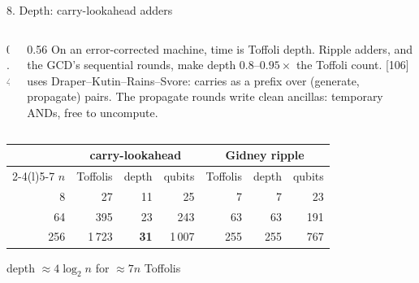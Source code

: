 \documentclass[aspectratio=169,11pt]{beamer}
\begin{document}
\setcounter{framenumber}{196}
\begin{frame}{8. Depth: carry-lookahead adders}
  \begin{columns}[c]
    \begin{column}{0.4\textwidth}
      \centering
    \end{column}
    \begin{column}{0.56\textwidth}
      \small On an error-corrected machine, time is Toffoli depth. Ripple adders, and the GCD's sequential rounds, make depth $0.8$--$0.95\times$ the Toffoli count.
      \vskip2mm
      [106] uses Draper--Kutin--Rains--Svore: carries as a prefix over (generate, propagate) pairs. The propagate rounds write clean ancillas: temporary ANDs, free to uncompute.
    \end{column}
  \end{columns}
  \vskip2mm
  \centering\footnotesize
  \renewcommand{\arraystretch}{1.05}
  \begin{tabular}{@{}rrrrrrr@{}}
    \toprule
    & \multicolumn{3}{c}{carry-lookahead} & \multicolumn{3}{c}{Gidney ripple} \\
    \cmidrule(lr){2-4}\cmidrule(l){5-7}
    $n$ & Toffolis & depth & qubits & Toffolis & depth & qubits \\
    \midrule
    8 & 27 & 11 & 25 & 7 & 7 & 23 \\
    64 & 395 & 23 & 243 & 63 & 63 & 191 \\
    256 & 1\,723 & \textbf{31} & 1\,007 & 255 & 255 & 767 \\
    \bottomrule
  \end{tabular}\par
  {\scriptsize depth $\approx4\log_2n$ for $\approx7n$ Toffolis}
\end{frame}
\end{document}
